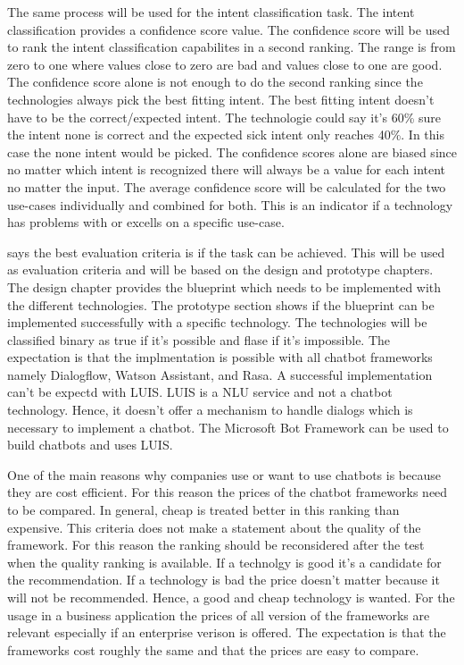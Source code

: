 The same process will be used for the intent classification task.
The intent classification provides a confidence score value.
The confidence score will be used to rank the intent classification 
capabilites in a second ranking.
The range is from zero to one where values close to zero are 
bad and values close to one are good.
The confidence score alone is not enough to do the second ranking 
since the technologies always pick the best fitting intent.
The best fitting intent doesn't have to be the correct/expected intent.
The technologie could say it's 60\% sure the intent none is correct 
and the expected sick intent only reaches 40\%.
In this case the none intent would be picked.
The confidence scores alone are biased since no matter 
which intent is recognized there will always be a value for 
each intent no matter the input.
The average confidence score will be calculated for the 
two use-cases individually and combined for both.
This is an indicator if a technology has problems with or excells
on a specific use-case.


\citet{singhbuilding} says the best evaluation criteria is if the 
task can be achieved.
This will be used as evaluation criteria and will be based on the 
design and prototype chapters.
The design chapter provides the blueprint which needs to be 
implemented with the different technologies.
The prototype section shows if the blueprint can be 
implemented successfully with a specific technology.
The technologies will be classified binary as true if it's possible and 
flase if it's impossible.
The expectation is that the implmentation is possible with 
all chatbot frameworks namely Dialogflow, Watson Assistant, and Rasa.
A successful implementation can't be expectd with LUIS.
LUIS is a NLU service and not a chatbot technology.
Hence, it doesn't offer a mechanism to handle dialogs which is 
necessary to implement a chatbot.
The Microsoft Bot Framework can be used to build chatbots 
and uses LUIS.

One of the main reasons why companies use or want to use chatbots is because they are cost efficient.
For this reason the prices of the chatbot frameworks need to be compared.
In general, cheap is treated better in this ranking than expensive.
This criteria does not make a statement about the quality of the framework.
For this reason the ranking should be reconsidered after the test when the 
quality ranking is available.
If a technolgy is good it's a candidate for the recommendation.
If a technology is bad the price doesn't matter because it will not be recommended.
Hence, a good and cheap technology is wanted. 
For the usage in a business application the prices of all version of the frameworks are relevant 
especially if an enterprise verison is offered.
The expectation is that the frameworks cost roughly the same and that 
the prices are easy to compare.

